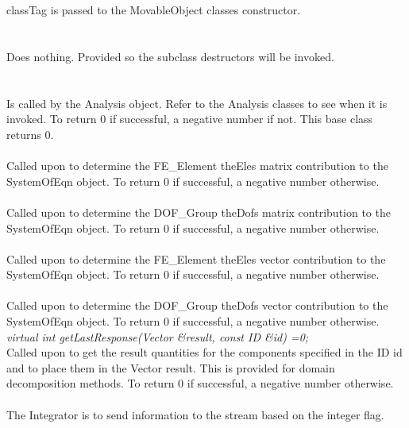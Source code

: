  \\
\\ 
\p classTag is passed to the MovableObject classes constructor. \\

 \\
\\ 
Does nothing. Provided so the subclass destructors will be invoked. \\

\\
 \\
Is called by the Analysis object. Refer to the Analysis classes to see
when it is invoked. To return $0$ if successful, a negative number if
not. This base class returns $0$.\\

 \\
Called upon to determine the FE\_Element \p theEles matrix
contribution to the SystemOfEqn object. To return $0$ if successful,
a negative number otherwise. \\ 
 

 \\
Called upon to determine the DOF\_Group \p theDofs matrix
contribution to the SystemOfEqn object. To return $0$ if successful,
a negative number otherwise. \\ 


 \\
Called upon to determine the FE\_Element \p theEles vector
contribution to the SystemOfEqn object. To return $0$ if successful,
a negative number otherwise. \\ 


 \\
Called upon to determine the DOF\_Group \p theDofs vector
contribution to the SystemOfEqn object. To return $0$ if successful,
a negative number otherwise. \\ 

{\em virtual int getLastResponse(Vector \&result, const ID \&id) =0;} \\
Called upon to get the result quantities for the components specified
in the ID \p id and to place them in the Vector \p result. This
is provided for domain decomposition methods. To return $0$ if
successful, a negative number otherwise. \\ 

\\
The Integrator is to send information to the stream based on the
integer \p flag. 

